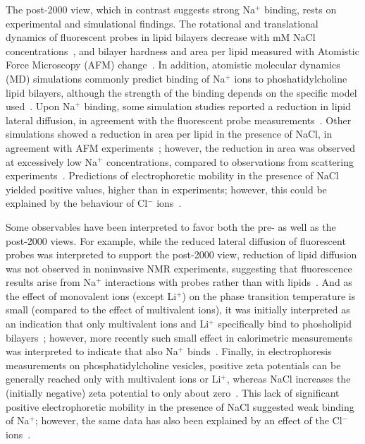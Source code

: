 \documentclass[twoside,twocolumn,9pt]{article}
\begin{document}
The post-2000 view, which in contrast suggests strong Na$^{+}$ binding, rests on experimental and simulational findings.
The rotational and translational dynamics of fluorescent probes in lipid bilayers decrease with mM NaCl concentrations~\cite{bockmann03,vacha09a,harb13}, and bilayer hardness and area per lipid measured with Atomistic Force Microscopy (AFM) change~\cite{manyes05,manyes06,fukuma07,ferber11,morata12}.
In addition, atomistic molecular dynamics (MD) simulations
commonly predict binding of Na${^+}$ ions 
to phoshatidylcholine lipid bilayers, although the strength of the binding depends on the specific model used~\cite{bockmann03,bockmann04,sachs04,berkowitz06,cordomi08,cordomi09,valley11,berkowitz12}. 
Upon Na$^+$ binding, some simulation studies reported a reduction in lipid lateral diffusion, 
in agreement with the fluorescent probe measurements~\cite{bockmann03,vacha09a,harb13}.
Other simulations showed a reduction in area per lipid in the presence of NaCl, 
in agreement with AFM experiments~\cite{manyes05,manyes06,fukuma07,ferber11,morata12};
however, the reduction in area was observed at excessively low Na$^+$ concentrations, 
compared to observations from scattering experiments~\cite{pabst07}.
Predictions of electrophoretic mobility in the presence of NaCl yielded positive values, higher than in experiments; 
however, this could be explained by the behaviour of Cl$^-$ ions~\cite{berkowitz06,knecht13}.

Some observables have been interpreted to favor both the pre- as well as the post-2000 views.
For example, while the reduced lateral diffusion of fluorescent probes was interpreted to support the post-2000 view,
reduction of lipid diffusion was not observed in noninvasive NMR experiments,
suggesting that fluorescence results arise from Na$^{+}$ interactions with probes rather than with lipids~\cite{filippov09}.
And as the effect of monovalent ions (except Li$^+$)  on the phase transition temperature is small
(compared to the effect of multivalent ions), it was initially interpreted 
as an indication that only multivalent ions and Li$^+$ specifically bind to phosholipid bilayers~\cite{cevc90}; 
however, more recently such small effect in calorimetric measurements was interpreted to indicate that 
also Na$^+$ binds~\cite{bockmann03,klasczyk10}.
Finally, in electrophoresis measurements on phosphatidylcholine vesicles, 
positive zeta potentials can be generally reached only with multivalent ions or Li$^+$,
whereas NaCl increases the (initially negative) zeta potential to only about zero~\cite{eisenberg79,tatulian87,manyes05,manyes06,klasczyk10}. 
This lack of significant positive electrophoretic mobility in the presence of NaCl suggested weak binding of Na$^+$; 
however, the same data has also been explained by an effect of the Cl$^-$ ions~\cite{berkowitz06,knecht13}.
\end{document}
